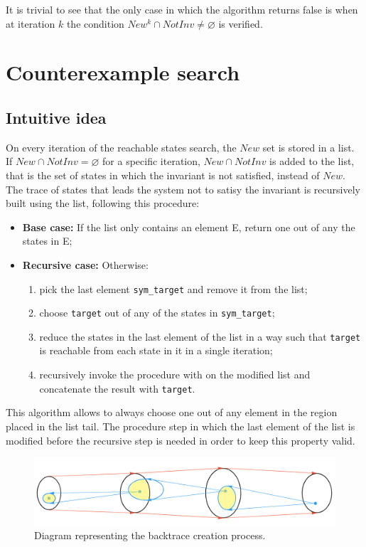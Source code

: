 \documentclass[12pt]{article}
\begin{document}
    It is trivial to see that the only case in which the algorithm returns false is when at iteration $k$ the condition $New^k \cap NotInv \neq \varnothing$ is verified.
    
    \section{Counterexample search}
    \subsection{Intuitive idea}
    On every iteration of the reachable states search, the $New$ set is stored in a list.
    If $New \cap NotInv = \varnothing$ for a specific iteration, $New \cap NotInv$ is added to the list, that is the set of states in which the invariant is not satisfied, instead of $New$.
    The trace of states that leads the system not to satisy the invariant is recursively built using the list, following this procedure:
    \begin{itemize}
        \item \textbf{Base case:} If the list only contains an element E, return one out of any the states in E;
        \item \textbf{Recursive case:} Otherwise:
        \begin{enumerate}
            \item pick the last element \texttt{sym\_target} and remove it from the list;
            \item choose \texttt{target} out of any of the states in \texttt{sym\_target};
            \item reduce the states in the last element of the list in a way such that \texttt{target} is reachable from each state in it in a single iteration;
            \item recursively invoke the procedure with on the modified list and concatenate the result with \texttt{target}.
        \end{enumerate}
    \end{itemize}
    This algorithm allows to always choose one out of any element in the region placed in the list tail.
    The procedure step in which the last element of the list is modified before the recursive step is needed in order to keep this property valid.

    \begin{figure}[H] 
        \centering
        \includegraphics[width=\textwidth]{backtrace-diagram.png}
        \caption{Diagram representing the backtrace creation process.}
    \end{figure}
\end{document}
